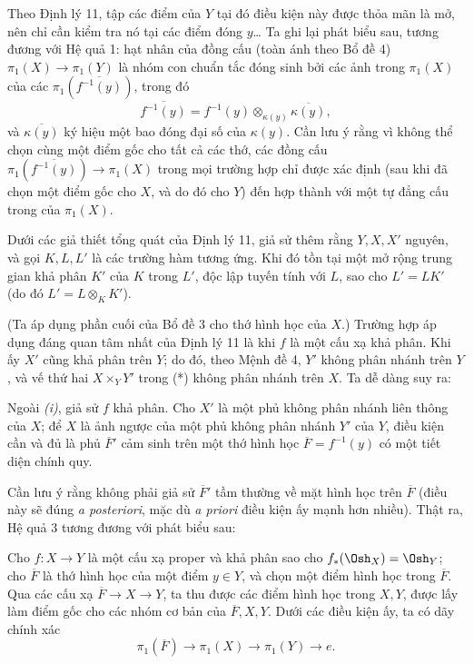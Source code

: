 Theo Định lý 11, tập các điểm của $Y$ tại đó điều kiện này được thỏa mãn là
mở, nên chỉ cần kiểm tra nó tại các điểm đóng $y$\ldots{} Ta ghi lại phát biểu
sau, tương đương với Hệ quả 1: hạt nhân của đồng cấu (toàn ánh theo Bổ đề 4)
$\pi_1(X)\longrightarrow\pi_1(Y)$ là nhóm con chuẩn tắc đóng sinh bởi các ảnh
trong $\pi_1(X)$ của các $\pi_1(\overline{f^{-1}(y)})$, trong đó
\[
  \overline{f^{-1}(y)}
  =f^{-1}(y)\otimes_{\kappa(y)}\overline{\kappa(y)},
\]
và $\overline{\kappa(y)}$ ký hiệu một bao đóng đại số của $\kappa(y)$. Cần lưu
ý rằng vì không thể chọn cùng một điểm gốc cho tất cả các thớ, các đồng cấu
$\pi_1(\overline{f^{-1}(y)})\longrightarrow\pi_1(X)$ trong mọi trường hợp chỉ
được xác định (sau khi đã chọn một điểm gốc cho $X$, và do đó cho $Y$) đến hợp
thành với một tự đẳng cấu trong của $\pi_1(X)$.

 Dưới các giả thiết tổng quát của Định lý 11, giả sử thêm
rằng $Y,X,X'$ nguyên, và gọi $K,L,L'$ là các trường hàm tương ứng. Khi đó tồn
tại một mở rộng trung gian khả phân $K'$ của $K$ trong $L'$, độc lập tuyến
tính với $L$, sao cho $L'=LK'$ (do đó $L'=L\otimes_K K'$).

(Ta áp dụng phần cuối của Bổ đề 3 cho thớ hình học của $X$.) Trường hợp áp dụng
đáng quan tâm nhất của Định lý 11 là khi $f$ là một cấu xạ khả phân. Khi ấy
$X'$ cũng khả phân trên $Y$; do đó, theo Mệnh đề 4, $Y'$ không phân nhánh trên
$Y$, và vế thứ hai $X\times_Y Y'$ trong (*) không phân nhánh trên $X$. Ta dễ
dàng suy ra:

 Ngoài \textit{(i)}, giả sử $f$ khả phân. Cho $X'$ là một
phủ không phân nhánh liên thông của $X$; để
$X$ là ảnh ngược của một phủ không phân nhánh $Y'$ của $Y$,
điều kiện cần và đủ là phủ $\overline F'$ cảm sinh trên một thớ hình học
$\overline F=f^{-1}(y)$ có một tiết diện chính quy.

Cần lưu ý rằng không phải giả sử $\overline F'$ tầm thường về mặt hình học
trên $\overline F$ (điều này sẽ đúng \textit{a posteriori}, mặc dù
\textit{a priori} điều kiện ấy mạnh hơn nhiều). Thật ra, Hệ quả 3 tương đương
với phát biểu sau:

 Cho $f:X\longrightarrow Y$ là một cấu xạ proper và khả
phân sao cho $f_*(\Osh_X)=\Osh_Y$; cho $\overline F$ là thớ hình học của một
điểm $y\in Y$, và chọn một điểm hình học trong $\overline F$. Qua các cấu xạ
$\overline F\longrightarrow X\longrightarrow Y$, ta thu được các điểm hình
học trong $X,Y$, được lấy làm điểm gốc cho các nhóm cơ bản của
$\overline F,X,Y$. Dưới các điều kiện ấy, ta có dãy chính xác
\[
  \boxed{
    \pi_1(\overline F)\longrightarrow\pi_1(X)
    \longrightarrow\pi_1(Y)\longrightarrow e
  }.
\]

